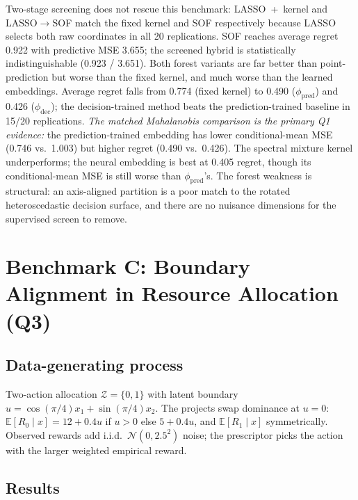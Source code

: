\documentclass[11pt]{article}
\begin{document}
Two-stage screening does not rescue this benchmark: LASSO~+~kernel and LASSO$\to$SOF match the fixed kernel and SOF respectively because LASSO selects both raw coordinates in all 20 replications. SOF reaches average regret 0.922 with predictive MSE 3.655; the screened hybrid is statistically indistinguishable (0.923 / 3.651). Both forest variants are far better than point-prediction but worse than the fixed kernel, and much worse than the learned embeddings. Average regret falls from 0.774 (fixed kernel) to 0.490 ($\phi_{\mathrm{pred}}$) and 0.426 ($\phi_{\mathrm{dec}}$); the decision-trained method beats the prediction-trained baseline in 15/20 replications. \emph{The matched Mahalanobis comparison is the primary Q1 evidence:} the prediction-trained embedding has lower conditional-mean MSE (0.746 vs.\ 1.003) but higher regret (0.490 vs.\ 0.426). The spectral mixture kernel underperforms; the neural embedding is best at 0.405 regret, though its conditional-mean MSE is still worse than $\phi_{\mathrm{pred}}$'s. The forest weakness is structural: an axis-aligned partition is a poor match to the rotated heteroscedastic decision surface, and there are no nuisance dimensions for the supervised screen to remove.

\section{Benchmark C: Boundary Alignment in Resource Allocation (Q3)}\label{sec:benchC}
\subsection*{Data-generating process}
Two-action allocation $\mathcal Z=\{0,1\}$ with latent boundary $u=\cos(\pi/4)x_1+\sin(\pi/4)x_2$. The projects swap dominance at $u=0$: $\mathbb E[R_0\mid x]=12+0.4u$ if $u>0$ else $5+0.4u$, and $\mathbb E[R_1\mid x]$ symmetrically. Observed rewards add i.i.d.\ $\mathcal N(0,2.5^2)$ noise; the prescriptor picks the action with the larger weighted empirical reward.

\subsection*{Results}
\begin{table}[H]
\centering
\small

\caption{Benchmark C summary over 20 replications.}
\label{tab:benchmark_c_summary}
\end{table}
\end{document}
